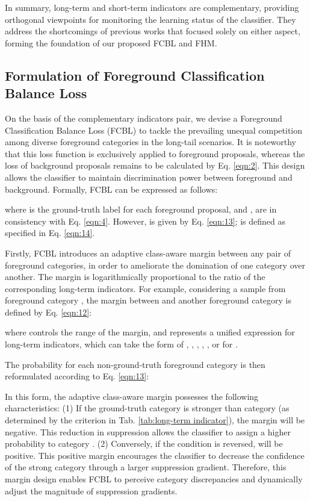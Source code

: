 \documentclass[lettersize,journal]{IEEEtran}
\begin{document}
In summary, long-term and short-term indicators are complementary, providing orthogonal viewpoints for monitoring the learning status of the classifier.
They address the shortcomings of previous works that focused solely on either aspect, forming the foundation of our proposed FCBL and FHM.






\subsection{Formulation of Foreground Classification Balance Loss}\label{sec:3.4}

On the basis of the complementary indicators pair, we devise a Foreground Classification Balance Loss (FCBL) to tackle the prevailing unequal competition among diverse foreground categories in the long-tail scenarios. It is noteworthy that this loss function is exclusively applied to foreground proposals, whereas the loss of background proposals remains to be calculated by Eq. \eqref{eqn:2}.
This design allows the classifier to maintain discrimination power between foreground and background.
Formally, FCBL can be expressed as follows:

where  is the ground-truth label for each foreground proposal, and ,  are in consistency with Eq. \eqref{eqn:4}. However,  is given by Eq. \eqref{eqn:13};  is defined as specified in Eq. \eqref{eqn:14}.

Firstly, FCBL introduces an adaptive class-aware margin between any pair of foreground categories, in order to ameliorate the domination of one category over another.
The margin is logarithmically proportional to the ratio of the corresponding long-term indicators.
For example, considering a sample from foreground category , the margin  between  and another foreground category  is defined by Eq. \eqref{eqn:12}:

where  controls the range of the margin, and  represents a unified expression for long-term indicators, which can take the form of , , , , , or  for .

The probability for each non-ground-truth foreground category  is then reformulated according to Eq. \eqref{eqn:13}:

In this form, the adaptive class-aware margin  possesses the following characteristics:
(1) If the ground-truth category  is stronger than category  (as determined by the criterion in Tab. \ref{tab:long-term indicator}), the margin  will be negative.
This reduction in suppression allows the classifier to assign a higher probability to category .
(2) Conversely, if the condition is reversed,  will be positive. 
This positive margin encourages the classifier to decrease the confidence of the strong category  through a larger suppression gradient.
Therefore, this margin design enables FCBL to perceive category discrepancies and dynamically adjust the magnitude of suppression gradients.
\end{document}

